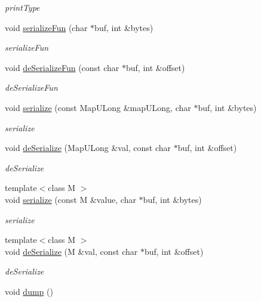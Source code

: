 \begin{DoxyCompactItemize}
\begin{DoxyCompactList}\small\item\em print\-Type \end{DoxyCompactList}\item 
void \hyperlink{class_a_p_i2_1_1_derived_type_a52d318a8f7b1044f2230098e01443c09}{serialize\-Fun} (char $\ast$buf, int \&bytes)
\begin{DoxyCompactList}\small\item\em serialize\-Fun \end{DoxyCompactList}\item 
void \hyperlink{class_a_p_i2_1_1_derived_type_a8642ff2eae11343e908d2f65f083050f}{de\-Serialize\-Fun} (const char $\ast$buf, int \&offset)
\begin{DoxyCompactList}\small\item\em de\-Serialize\-Fun \end{DoxyCompactList}\item 
void \hyperlink{class_a_p_i2_1_1_derived_type_ad76d9a31687ac3293bf70616b140b66b}{serialize} (const Map\-U\-Long \&map\-U\-Long, char $\ast$buf, int \&bytes)
\begin{DoxyCompactList}\small\item\em serialize \end{DoxyCompactList}\item 
void \hyperlink{class_a_p_i2_1_1_derived_type_a4b5c5630b2df8b85709fd1d72525c014}{de\-Serialize} (Map\-U\-Long \&val, const char $\ast$buf, int \&offset)
\begin{DoxyCompactList}\small\item\em de\-Serialize \end{DoxyCompactList}\item 
{\footnotesize template$<$class M $>$ }\\void \hyperlink{class_a_p_i2_1_1_derived_type_aa9a44ffb06a192f2c393de76f99b090d}{serialize} (const M \&value, char $\ast$buf, int \&bytes)
\begin{DoxyCompactList}\small\item\em serialize \end{DoxyCompactList}\item 
{\footnotesize template$<$class M $>$ }\\void \hyperlink{class_a_p_i2_1_1_derived_type_af0921a26c6979402022919535e0f168d}{de\-Serialize} (M \&val, const char $\ast$buf, int \&offset)
\begin{DoxyCompactList}\small\item\em de\-Serialize \end{DoxyCompactList}\item 
\hypertarget{class_a_p_i2_1_1_derived_type_ac0d22377803e953a28f69dcd468f3f0b}{void \hyperlink{class_a_p_i2_1_1_derived_type_ac0d22377803e953a28f69dcd468f3f0b}{dump} ()}\label{class_a_p_i2_1_1_derived_type_ac0d22377803e953a28f69dcd468f3f0b}


\end{DoxyCompactItemize}
